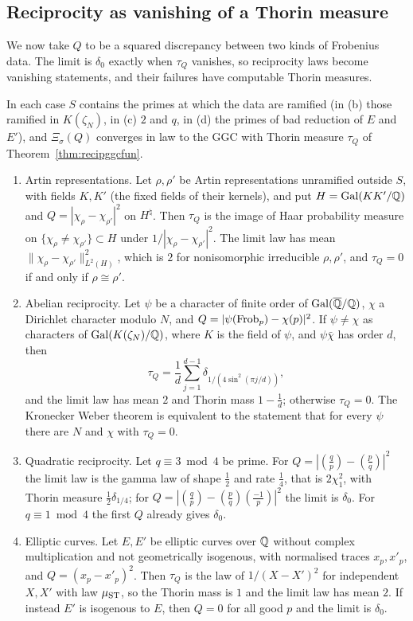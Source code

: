 \subsection{Reciprocity as vanishing of a Thorin measure}

We now take $Q$ to be a squared discrepancy between two kinds of Frobenius data. The limit is $\delta_0$ exactly when $\tau_Q$ vanishes, so reciprocity laws become vanishing statements, and their failures have computable Thorin measures.

\begin{theorem}\label{thm:recipthorin}
In each case $S$ contains the primes at which the data are ramified (in (b) those ramified in $K(\zeta_N)$, in (c) $2$ and $q$, in (d) the primes of bad reduction of $E$ and $E'$), and $\Xi_\sigma(Q)$ converges in law to the GGC with Thorin measure $\tau_Q$ of Theorem~\ref{thm:recipggcfun}.
\begin{enumerate}
\item[(a)] Artin representations. Let $\rho,\rho'$ be Artin representations unramified outside $S$, with fields $K,K'$ (the fixed fields of their kernels), and put $H=\operatorname{Gal}(KK'/\mathbb{Q})$ and $Q=|\chi_\rho-\chi_{\rho'}|^2$ on $H^\natural$. Then $\tau_Q$ is the image of Haar probability measure on $\{\chi_\rho\ne\chi_{\rho'}\}\subset H$ under $1/|\chi_\rho-\chi_{\rho'}|^2$. The limit law has mean $\|\chi_\rho-\chi_{\rho'}\|^2_{L^2(H)}$, which is $2$ for nonisomorphic irreducible $\rho,\rho'$, and $\tau_Q=0$ if and only if $\rho\cong\rho'$.
\item[(b)] Abelian reciprocity. Let $\psi$ be a character of finite order of $\operatorname{Gal}(\overline{\mathbb{Q}}/\mathbb{Q})$, $\chi$ a Dirichlet character modulo $N$, and $Q=|\psi(\operatorname{Frob}_p)-\chi(p)|^2$. If $\psi\ne\chi$ as characters of $\operatorname{Gal}(K(\zeta_N)/\mathbb{Q})$, where $K$ is the field of $\psi$, and $\psi\bar\chi$ has order $d$, then
\[
\tau_Q=\frac1d\sum_{j=1}^{d-1}\delta_{1/(4\sin^2(\pi j/d))},
\]
and the limit law has mean $2$ and Thorin mass $1-\frac1d$; otherwise $\tau_Q=0$. The Kronecker Weber theorem is equivalent to the statement that for every $\psi$ there are $N$ and $\chi$ with $\tau_Q=0$.
\item[(c)] Quadratic reciprocity. Let $q\equiv3\bmod4$ be prime. For $Q=|(\frac qp)-(\frac pq)|^2$ the limit law is the gamma law of shape $\frac12$ and rate $\frac14$, that is $2\chi^2_1$, with Thorin measure $\frac12\delta_{1/4}$; for $Q=|(\frac qp)-(\frac pq)(\frac{-1}p)|^2$ the limit is $\delta_0$. For $q\equiv1\bmod4$ the first $Q$ already gives $\delta_0$.
\item[(d)] Elliptic curves. Let $E,E'$ be elliptic curves over $\mathbb{Q}$ without complex multiplication and not geometrically isogenous, with normalised traces $x_p,x'_p$, and $Q=(x_p-x'_p)^2$. Then $\tau_Q$ is the law of $1/(X-X')^2$ for independent $X,X'$ with law $\mu_{\mathrm{ST}}$, so the Thorin mass is $1$ and the limit law has mean $2$. If instead $E'$ is isogenous to $E$, then $Q=0$ for all good $p$ and the limit is $\delta_0$.
\end{enumerate}
\end{theorem}

